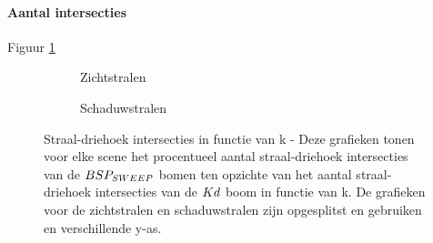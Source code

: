 \paragraph{Aantal intersecties}
Figuur \ref{fig:k-intersecties}
\begin{figure}
  \centering
  \begin{subfigure}{\linewidth}
  \centering
  \begin{subfigure}[t]{.32\linewidth}
    \centering
{}
  \end{subfigure}
  \begin{subfigure}[t]{.32\linewidth}
    \centering
{}
\end{subfigure}
\begin{subfigure}[t]{.32\linewidth}
  \centering
{}
\end{subfigure}
\caption{Zichtstralen}
\end{subfigure}
\begin{subfigure}{\linewidth}
  \centering
  \begin{subfigure}[t]{.32\linewidth}
    \centering
{}
  \end{subfigure}
  \begin{subfigure}[t]{.32\linewidth}
    \centering
{}
\end{subfigure}
\begin{subfigure}[t]{.32\linewidth}
  \centering
{}
\end{subfigure}
\caption{Schaduwstralen}
\end{subfigure}
\caption[Straal-driehoek intersecties in functie van k]{Straal-driehoek intersecties in functie van k - \small Deze grafieken tonen voor elke scene het procentueel aantal straal-driehoek intersecties van de $BSP_{SWEEP}$ bomen ten opzichte van het aantal straal-driehoek intersecties van de $Kd$ boom in functie van k. De grafieken voor de zichtstralen en schaduwstralen zijn opgesplitst en gebruiken en verschillende y-as.}
\label{fig:k-intersecties}
\end{figure}

